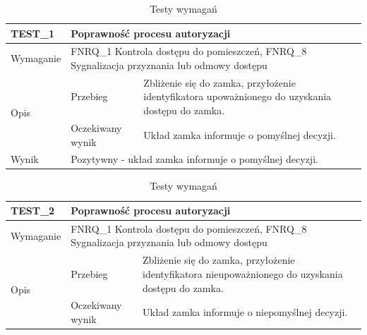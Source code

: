         \begin{table}[h!]
            \caption{Testy wymagań}
            \centering
            \begin{subtable}[c]{\textwidth}
                \centering
                    \begin{tabular}{p{2cm}|p{}|p{}}
                    TEST\_1               & \multicolumn{2}{l}{\textbf{Poprawność procesu autoryzacji}} \\ \hline
                    Wymaganie             & \multicolumn{2}{p{12cm}}{FNRQ\_1 Kontrola dostępu do pomieszczeń, FNRQ\_8 Sygnalizacja przyznania lub odmowy dostępu} \\ \hline
                    \multirow{2}{*}{Opis} & Przebieg           & Zbliżenie się do zamka, przyłożenie identyfikatora upoważnionego do uzyskania dostępu do zamka. \\ \cline{2-3}
                                          & Oczekiwany wynik   & Układ zamka informuje o pomyślnej decyzji.                                                 \\ \hline
                    Wynik                 & \multicolumn{2}{p{12cm}}{Pozytywny - układ zamka informuje o pomyślnej decyzji.}                                                                                  \\
                    \end{tabular}%
                \label{tbl:test1}
                \vspace{10mm}
            \end{subtable}
        \quad%
            \begin{subtable}[c]{\textwidth}
                \centering
                    \begin{tabular}{p{2cm}|p{}|p{}}
                    TEST\_2               & \multicolumn{2}{l}{\textbf{Poprawność procesu autoryzacji}}                                                            \\ \hline
                    Wymaganie             & \multicolumn{2}{p{12cm}}{FNRQ\_1 Kontrola dostępu do pomieszczeń, FNRQ\_8 Sygnalizacja przyznania lub odmowy dostępu} \\ \hline
                    \multirow{2}{*}{Opis} & Przebieg           & Zbliżenie się do zamka, przyłożenie identyfikatora nieupoważnionego do uzyskania dostępu do zamka. \\ \cline{2-3}
                                          & Oczekiwany wynik   & Układ zamka informuje o niepomyślnej decyzji.                                                 \\ \hline

\end{tabular}
\end{subtable}
\end{table}
